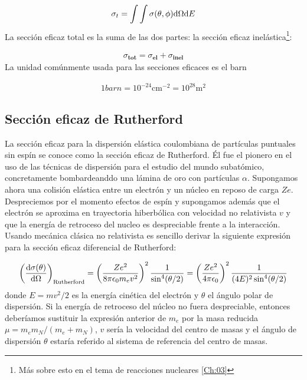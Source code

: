 \begin{equation}
	\sigma_t = \int \int \sigma(\theta,\phi) \mathrm{d} \Omega \mathrm{d} E
\end{equation}
La sección eficaz total es la suma de las dos partes: la sección eficaz inelástica\footnote{Más sobre esto en el tema de reacciones nucleares \ref{Ch:03}}:

\begin{eqnarray}
	\sigma_{\textbf{tot}} = \sigma_{\textbf{el}}+ \sigma_{\textbf{inel}}
\end{eqnarray}
La unidad comúnmente usada para las secciones eficaces es el barn

\begin{eqnarray}
	1 \unit{barn} = 10^{-24} \unit{\cm^{-2}} = 10^{28}  \unit{\m^2}
\end{eqnarray}


\subsection{Sección eficaz de Rutherford}

La sección eficaz para la dispersión elástica coulombiana de partículas puntuales sin espín se conoce como la sección eficaz de Rutherford. Él fue el pionero en el uso de las técnicas de dispersión para el estudio del mundo subatómico, concretamente bombardeanddo una lámina de oro con partículas $\alpha$. Supongamos ahora una colisión elástica entre un electrón y un núcleo en reposo de carga $Ze$. Despreciemos por el momento efectos de espín y supongamos además que el electrón se aproxima en trayectoria hiberbólica con velocidad no relativista $v$ y que la energía de retroceso del nucleo es despreciable frente a la interacción. Usando mecánica clásica no relativista es sencillo derivar la siguiente expresión para la sección eficaz diferencial de Rutherford:

\begin{equation}
	\left( \frac{\mathrm{d} \sigma(\theta)}{\mathrm{d} \Omega} \right)_{\text{Rutherford}} = \left( \frac{Ze^2}{8 \pi \epsilon_0 m_e v^2} \right)^2 \frac{1}{\sin^4 (\theta/2)} = \left( \frac{Ze^2}{ 4 \pi \epsilon_0} \right)^2 \frac{1}{(4E)^2\sin^4 (\theta/2)}
\end{equation}
donde $E=mv^2/2$ es la energía cinética del electrón y $\theta$ el ángulo polar de dispersión. Si la energía de retroceso del núcleo no fuera despreciable, entonces deberíamos sustituir la expresión anterior de $m_e$ por la masa reducida $\mu=m_em_N / (m_e+m_N)$, $v$ sería la velocidad del centro de masas y el ángulo de dispersión $\theta$ estaría referido al sistema de referencia del centro de masas.

